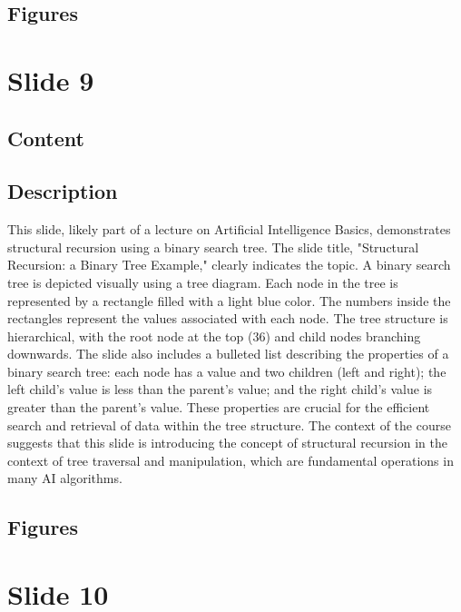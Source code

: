 \documentclass{article}%
\begin{document}
\subsection{Figures}%
\begin{figure}[H]%
\centering%
\end{figure}

%
\newpage%
\section{Slide 9}%
\label{sec:Slide9}%
\subsection{Content}%
%
\subsection{Description}%
This slide, likely part of a lecture on Artificial Intelligence Basics, demonstrates structural recursion using a binary search tree.  The slide title, "Structural Recursion: a Binary Tree Example," clearly indicates the topic.  A binary search tree is depicted visually using a tree diagram.  Each node in the tree is represented by a rectangle filled with a light blue color.  The numbers inside the rectangles represent the values associated with each node.  The tree structure is hierarchical, with the root node at the top (36) and child nodes branching downwards.  The slide also includes a bulleted list describing the properties of a binary search tree: each node has a value and two children (left and right); the left child's value is less than the parent's value; and the right child's value is greater than the parent's value.  These properties are crucial for the efficient search and retrieval of data within the tree structure.  The context of the course suggests that this slide is introducing the concept of structural recursion in the context of tree traversal and manipulation, which are fundamental operations in many AI algorithms.%
\subsection{Figures}%
\begin{figure}[H]%
\centering%
\end{figure}

%
\newpage%
\section{Slide 10}%
\label{sec:Slide10}%
\end{document}
